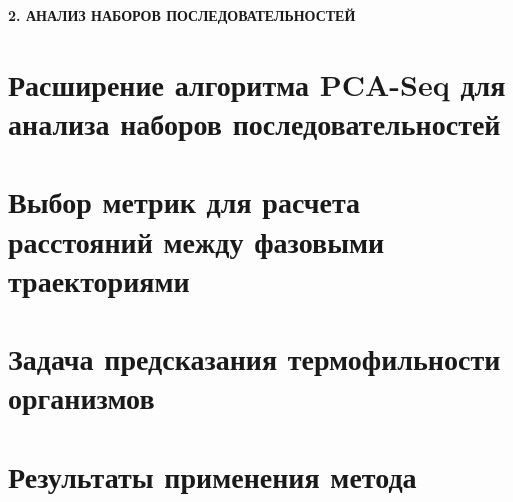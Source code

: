 \newpage
\begin{center}
  \textbf{\large 2. АНАЛИЗ НАБОРОВ ПОСЛЕДОВАТЕЛЬНОСТЕЙ}
\end{center}

\section{Расширение алгоритма PCA-Seq для анализа наборов последовательностей}

\section{Выбор метрик для расчета расстояний между фазовыми траекториями}

\section{Задача предсказания термофильности организмов}

\section{Результаты применения метода}
